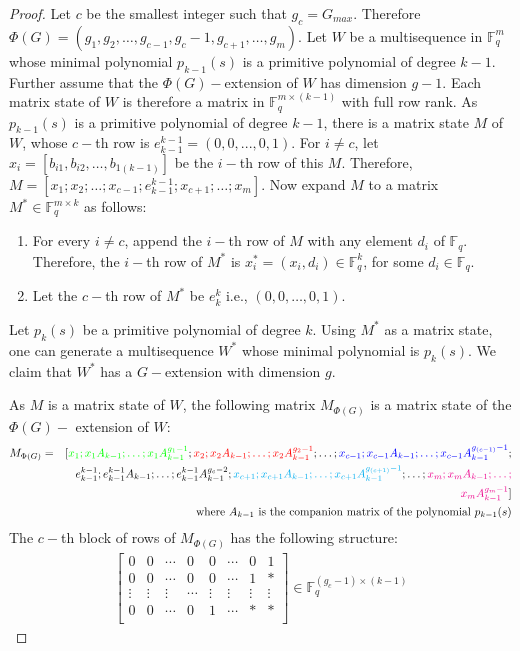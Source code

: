 \documentclass[letterpaper, 12 pt]{article}  \usepackage{amssymb}
\newcommand{\F}{\mathbb{F}}
\begin{document}
\begin{proof}
Let $c$ be the smallest integer such that $g_c =
G_{max}$. Therefore $\Phi(G) =(g_1, g_2, \ldots, g_{c-1}, g_c-1, g_{c+1},
\ldots, g_m)$. Let $W$ be a multisequence in $\F_q^m$ whose minimal 
polynomial $p_{k-1}(s)$ is a primitive polynomial of degree $k-1$. Further 
assume that the $\Phi(G)-$extension of $W$ has dimension $g-1$.
 Each matrix state of $W$ is therefore a matrix in $\F_q^{m\times (k-1)}$ with
full row rank. As $p_{k-1}(s)$ is a primitive polynomial 
of degree $k-1$, there is a matrix state $M$ of $W$, whose $c-$th row is 
$e_{k-1}^{k-1} = (0, 0, ..., 0, 1)$. For $i \neq c$, let
$x_i=[b_{i1},b_{i2},\ldots,b_{1(k-1)}]$ be
the $i-$th
row of this $M$. Therefore, $M = [x_1; x_2; \ldots; x_{c-1}; e_{k-1}^{k-1};
x_{c+1};
\ldots;x_m]$. Now expand $M$ to a matrix $M^* \in \F_q^{m \times
k}$ as follows:
\begin{enumerate}
 \item For every $i \neq c$, append the $i-$th row of $M$ with any element $d_i$
of $\F_q$. Therefore, the $i-$th row of $M^*$ is $x_i^* = (x_i,d_i) \in
\F_q^{k}$, for some $d_i \in \F_q$.
\item Let the $c-$th row of $M^*$ be $e_{k}^{k}$ i.e., $(0,0,\ldots,0,1)$.
 
\end{enumerate}
Let $p_k(s)$ be a primitive polynomial of degree $k$. Using $M^*$ 
as a matrix state, one can generate a multisequence $W^*$ whose minimal 
polynomial is $p_k(s)$. We claim that $W^*$ has a $G-$extension with dimension 
$g$.  

As $ M$ is a matrix state of $W$, the following matrix $M_{\Phi(G)}$ is a
 matrix state of the $\Phi(G)-$ extension of $W$:
\begin{eqnarray*}
 M_{\Phi(G)} &=& [\textcolor{green}{x_1;x_1A_{k-1};\ldots;x_1A_{k-1}^{g_1-1}};
\textcolor{red}{x_2;x_2A_{k-1};\ldots;x_2A_{k-1}^{g_2-1}}; \ldots;
 \textcolor{blue}{x_{c-1};x_{c-1}A_{k-1};\ldots;x_{c-1}A_{k-1}^{g_{(c-1)}-1}}
;\\&&
e_{k-1}^{k-1};e_{k-1}^{k-1}A_{k-1};\ldots;e_{k-1}^{k-1}A_{k-1}^{g_c-2}
;\textcolor {cyan} {
x_{c+1};x_{c+1}A_{k-1};\ldots;x_{c+1}A_{k-1}^{g_{(c+1)}-1}};
\ldots;\textcolor{magenta}{x_m;x_mA_{k-1};\ldots;}\\&&
\textcolor{magenta}{x_mA_{k-1}^{g_m-1}}]\\
&& \textrm{where } A_{k-1} \textrm{ is the companion matrix of the polynomial
}p_{k-1}(s)
\end{eqnarray*}
 The $c-$th block of rows of
$M_{\Phi(G)}$ has the following structure:
 \begin{eqnarray*}
\left[ \begin{array}{cccc|cccc}
  0 & 0 & \cdots & 0 & 0 & \cdots & 0 & 1\\
  0 & 0 & \cdots & 0 & 0 & \cdots & 1 & *\\
  \vdots & \vdots & \vdots & \cdots & \vdots & \vdots & \vdots & \vdots\\
  0 & 0 & \cdots &  0& 1 & \cdots & * & *\\
 \end{array}\right]\in \F_q^{(g_c-1) \times (k-1)}
\end{eqnarray*}


\end{proof}
\end{document}
